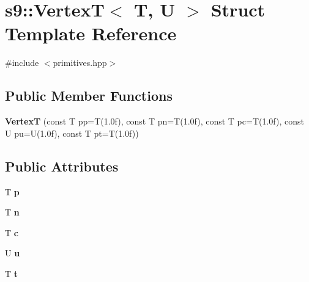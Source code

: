 \hypertarget{structs9_1_1VertexT}{\section{s9\-:\-:\-Vertex\-T$<$ \-T, \-U $>$ \-Struct \-Template \-Reference}
\label{structs9_1_1VertexT}
}


{\ttfamily \#include $<$primitives.\-hpp$>$}

\subsection*{\-Public \-Member \-Functions}
\begin{DoxyCompactItemize}
\item 
\hypertarget{structs9_1_1VertexT_ac360d39a7e7b3289ca6c1418fa2ed5b7}{{\bfseries \-Vertex\-T} (const \-T pp=\-T(1.\-0f), const T pn=\-T(1.\-0f), const T pc=\-T(1.\-0f), const U pu=\-U(1.\-0f), const T pt=\-T(1.\-0f))}\label{structs9_1_1VertexT_ac360d39a7e7b3289ca6c1418fa2ed5b7}

\end{DoxyCompactItemize}
\subsection*{\-Public \-Attributes}
\begin{DoxyCompactItemize}
\item 
\hypertarget{structs9_1_1VertexT_a85c5642c074508dd159fa4497c6b2a0c}{\-T {\bfseries p}}\label{structs9_1_1VertexT_a85c5642c074508dd159fa4497c6b2a0c}

\item 
\hypertarget{structs9_1_1VertexT_a0327b7e4fa535f6a16b12374d980c18b}{\-T {\bfseries n}}\label{structs9_1_1VertexT_a0327b7e4fa535f6a16b12374d980c18b}

\item 
\hypertarget{structs9_1_1VertexT_a0906bc2a04c5bf12d5483daaab81bc28}{\-T {\bfseries c}}\label{structs9_1_1VertexT_a0906bc2a04c5bf12d5483daaab81bc28}

\item 
\hypertarget{structs9_1_1VertexT_a85c4511e84ea1e51b1a5896dbe583af2}{\-U {\bfseries u}}\label{structs9_1_1VertexT_a85c4511e84ea1e51b1a5896dbe583af2}

\item 
\hypertarget{structs9_1_1VertexT_ac5ff8b99b43ed9d61069f65745757d66}{\-T {\bfseries t}}\label{structs9_1_1VertexT_ac5ff8b99b43ed9d61069f65745757d66}

\end{DoxyCompactItemize}


